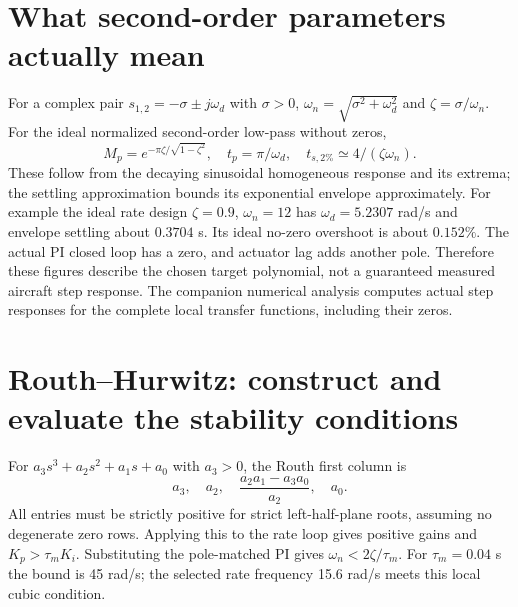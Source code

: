\section{What second-order parameters actually mean}
For a complex pair $s_{1,2}=-\sigma\pm j\omega_d$ with $\sigma>0$,
$\omega_n=\sqrt{\sigma^2+\omega_d^2}$ and $\zeta=\sigma/\omega_n$.
For the ideal normalized second-order low-pass without zeros,
\begin{equation}
M_p=e^{-\pi\zeta/\sqrt{1-\zeta^2}},\quad
t_p=\pi/\omega_d,\quad t_{s,2\%}\simeq4/(\zeta\omega_n).
\end{equation}
These follow from the decaying sinusoidal homogeneous response and its extrema;
the settling approximation bounds its exponential envelope approximately.
For example the ideal rate design $\zeta=0.9$, $\omega_n=12$ has
$\omega_d=5.2307$ rad/s and envelope settling about $0.3704$ s. Its ideal
no-zero overshoot is about $0.152\%$. The actual PI closed loop has a zero,
and actuator lag adds another pole. Therefore these figures describe the
chosen target polynomial, not a guaranteed measured aircraft step response.
The companion numerical analysis computes actual step responses for the
complete local transfer functions, including their zeros.

\section{Routh--Hurwitz: construct and evaluate the stability conditions}
For $a_3s^3+a_2s^2+a_1s+a_0$ with $a_3>0$, the Routh first column is
\begin{equation}
a_3,\quad a_2,\quad\frac{a_2a_1-a_3a_0}{a_2},\quad a_0.
\end{equation}
All entries must be strictly positive for strict left-half-plane roots, assuming
no degenerate zero rows. Applying this to the rate loop gives positive gains
and $K_p>\tau_mK_i$. Substituting the pole-matched PI gives
$\omega_n<2\zeta/\tau_m$. For $\tau_m=0.04$ s the bound is 45 rad/s;
the selected rate frequency 15.6 rad/s meets this local cubic condition.

